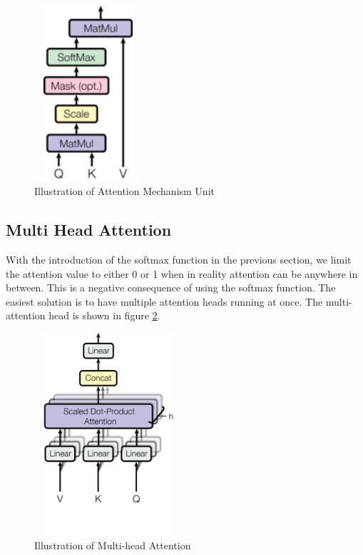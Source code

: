 \begin{figure}[ht]
\includegraphics[width=4.0cm, height=6.5cm]{images/attention unit.png}
\centering
\caption{Illustration of Attention Mechanism Unit \protect\cite{attention-is-all-you-need}}
\label{fig:attention-unit}
\end{figure}
\FloatBarrier


\subsection{Multi Head Attention}

With the introduction of the softmax function in the previous section, we limit the attention value to either 0 or 1 when in reality attention can be anywhere in between. This is a negative consequence of using the softmax function. The easiest solution is to have multiple attention heads running at once. The multi-attention head is shown in figure \ref{fig:multi-head}.

\begin{figure}[ht]
\includegraphics[width=5.5cm, height=7.5cm]{images/multi-head attention.png}
\centering
\caption{Illustration of Multi-head Attention \protect\cite{attention-is-all-you-need}}
\label{fig:multi-head}
\end{figure}
\FloatBarrier

